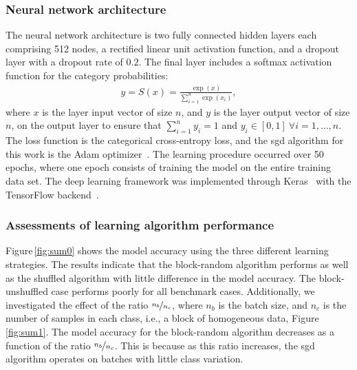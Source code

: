 \documentclass[review]{elsarticle}
\begin{document}
\subsubsection{Neural network architecture}
The neural network architecture is two
fully connected hidden layers each comprising 512 nodes, a rectified
linear unit activation function, and a dropout layer with a dropout
rate of $0.2$. The final layer includes a softmax activation function
for the category probabilities:
\begin{align}
  y = S(x) = \frac{\exp{(x)}}{\sum^n_{i=1} \exp{(x_i)}},
\end{align}
where $x$ is the layer input vector of size $n$, and $y$ is the layer
output vector of size $n$, on the output layer to ensure that
$\sum^n_{i=1} y_i = 1$ and $y_i \in [0,1]~\forall i = 1, \dots,
n$. The loss function is the categorical cross-entropy loss, and the
\gls{sgd} algorithm for this work is the Adam
optimizer~\cite{Kingma2014}. The learning procedure occurred over 50
epochs, where one epoch consists of training the model on the entire
training data set. The deep learning framework was implemented through
Keras~\cite{Chollet2015} with the TensorFlow
backend~\cite{tensorflow2015-whitepaper}.

\subsubsection{Assessments of learning algorithm performance}

Figure\,\ref{fig:sum0} shows the model accuracy using the three
different learning strategies. The results indicate that the block-random
algorithm performs as well as the shuffled algorithm with little
difference in the model accuracy. The block-unshuffled case performs poorly
for all benchmark cases. Additionally, we investigated the effect of
the ratio $\nicefrac{n_b}{n_c}$, where $n_b$ is the batch size, and
$n_c$ is the number of samples in each class, i.e., a block of
homogeneous data, Figure\,\ref{fig:sum1}. The model accuracy for the
block-random algorithm decreases as a function of the ratio
$\nicefrac{n_b}{n_c}$. This is because as this ratio increases, the
\gls{sgd} algorithm operates on batches with little
class variation.
\end{document}
